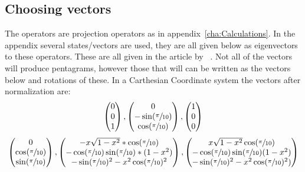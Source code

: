\subsection{Choosing vectors}\label{subsec:Choosing vectors}
The operators are projection operators as in  appendix~\ref{cha:Calculations}. 
In the appendix several states/vectors are used, they are all given below as eigenvectors to these operators. These are all given in the article by ~\cite{Kochen1968The}. Not all of the vectors will produce pentagrams, however those that will can be written as the vectors below and rotations of these.
In a Carthesian Coordinate system the vectors after normalization are:
\\
\begin{equation*}
\begin{pmatrix}
0\\
0\\
1\\
\end{pmatrix}
,
\begin{pmatrix}
0\\
-\sin(\sfrac{\pi}{10})\\
\cos(\sfrac{\pi}{10})
\end{pmatrix}
,
\begin{pmatrix}
1\\
0\\
0\\
\end{pmatrix}
\end{equation*}
\begin{equation*}
\begin{pmatrix}
0\\
\cos(\sfrac{\pi}{10})\\
\sin(\sfrac{\pi}{10})\\
\end{pmatrix}
,
\begin{pmatrix}
-x\sqrt{1-x^2}*\cos(\sfrac{\pi}{10})\\
-\cos(\sfrac{\pi}{10})\sin(\sfrac{\pi}{10})*(1-x^2)\\
-\sin(\sfrac{\pi}{10})^2-x^2\cos(\sfrac{\pi}{10})^2\\
\end{pmatrix}
,
\begin{pmatrix}
x\sqrt{1-x^2}\cos(\sfrac{\pi}{10})\\
-\cos(\sfrac{\pi}{10})\sin(\sfrac{\pi}{10})(1-x^2)\\
-\sin(\sfrac{\pi}{10})^2-x^2\cos(\sfrac{\pi}{10})^2)\\
\end{pmatrix}
\end{equation*}
